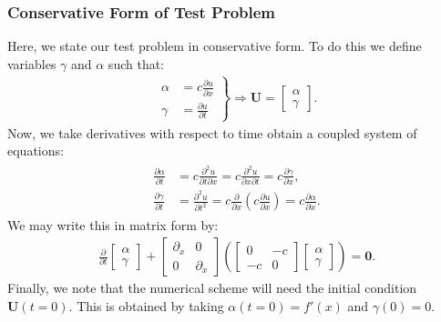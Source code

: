 \documentclass[../main.tex]{subfiles}
\begin{document}
\subsubsection{Conservative Form of Test Problem}
\noindent Here, we state our test problem \label{eq:wave} in conservative form. To do this we define variables $\gamma$ and $\alpha$ such that:
\begin{gather*}
    \left.
    \begin{aligned}
        \alpha &= c\frac{\partial u}{\partial x}\\
        \gamma &= \frac{\partial u}{\partial t}
    \end{aligned}
    \right\}
    \Rightarrow
    \mathbf{U} = \begin{bmatrix} \alpha \\ \gamma\end{bmatrix}.
\end{gather*}
Now, we take derivatives with respect to time obtain a coupled system of equations:
\begin{gather*}
    \begin{aligned}
         \frac{\partial \alpha}{\partial t} &= c\frac{\partial^2 u}{\partial t \partial x} = c\frac{\partial^2 u}{\partial x \partial t} = c\frac{\partial \gamma}{\partial x},\\
        \frac{\partial \gamma}{\partial t} &= \frac{\partial^2 u}{\partial t^2} = c \frac{\partial}{\partial x}\left( c \frac{\partial u}{\partial x}\right) = c \frac{\partial \alpha}{\partial x}.
    \end{aligned}
\end{gather*}
We may write this in matrix form by:
\begin{gather*}
\frac{\partial }{\partial t}
\begin{bmatrix}
\alpha\\\gamma
\end{bmatrix}
+
\begin{bmatrix}
\partial_x & 0\\
0 & \partial_x 
\end{bmatrix}
\left(
\begin{bmatrix}
0 & -c\\
-c & 0
\end{bmatrix}
\begin{bmatrix}
\alpha\\\gamma
\end{bmatrix}
\right)
=
\mathbf{0}.
\end{gather*}
Finally, we note that the numerical scheme will need the initial condition $\mathbf{U}(t=0)$. This is obtained by taking $\alpha(t=0)=f'(x)$ and $\gamma(0)=0$.
 
\end{document}
